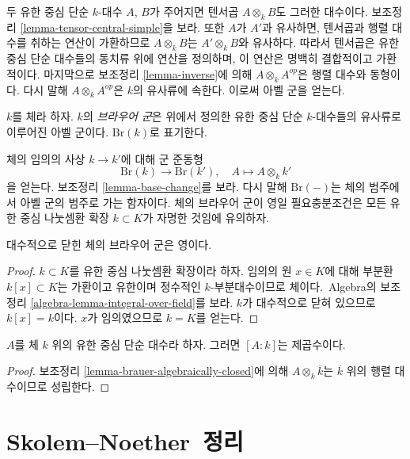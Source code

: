\noindent
두 유한 중심 단순 $k$-대수 $A$, $B$가 주어지면 텐서곱
$A \otimes_k B$도 그러한 대수이다. 보조정리
\ref{lemma-tensor-central-simple}을 보라.
또한 $A$가 $A'$과 유사하면, 텐서곱과 행렬 대수를 취하는 연산이 가환하므로
$A \otimes_k B$는 $A' \otimes_k B$와 유사하다. 따라서 텐서곱은 유한
중심 단순 대수들의 동치류 위에 연산을 정의하며, 이 연산은 명백히 결합적이고
가환적이다. 마지막으로 보조정리 \ref{lemma-inverse}에 의해
$A \otimes_k A^{op}$은 행렬 대수와 동형이다. 다시 말해
$A \otimes_k A^{op}$은 $k$의 유사류에 속한다. 이로써 아벨 군을 얻는다.

\begin{definition}
\label{definition-brauer-group}
$k$를 체라 하자. $k$의 {\it 브라우어 군}은 위에서 정의한 유한 중심 단순
$k$-대수들의 유사류로 이루어진 아벨 군이다. $\text{Br}(k)$로 표기한다.
\end{definition}

\noindent
체의 임의의 사상 $k \to k'$에 대해 군 준동형
$$
\text{Br}(k) \longrightarrow \text{Br}(k'),\quad
A \longmapsto A \otimes_k k'
$$
을 얻는다. 보조정리 \ref{lemma-base-change}를 보라. 다시 말해
$\text{Br}(-)$는 체의 범주에서 아벨 군의 범주로 가는 함자이다.
체의 브라우어 군이 영일 필요충분조건은 모든 유한 중심 나눗셈환 확장
$k \subset K$가 자명한 것임에 유의하자.

\begin{lemma}
\label{lemma-brauer-algebraically-closed}
대수적으로 닫힌 체의 브라우어 군은 영이다.
\end{lemma}

\begin{proof}
$k \subset K$를 유한 중심 나눗셈환 확장이라 하자. 임의의 원
$x \in K$에 대해 부분환 $k[x] \subset K$는 가환이고 유한이며 정수적인
$k$-부분대수이므로 체이다.~Algebra의 보조정리
\ref{algebra-lemma-integral-over-field}를 보라. $k$가 대수적으로 닫혀 있으므로
$k[x] = k$이다. $x$가 임의였으므로 $k = K$를 얻는다.
\end{proof}

\begin{lemma}
\label{lemma-dimension-square}
$A$를 체 $k$ 위의 유한 중심 단순 대수라 하자. 그러면 $[A : k]$는
제곱수이다.
\end{lemma}

\begin{proof}
보조정리 \ref{lemma-brauer-algebraically-closed}에 의해
$A \otimes_k \overline{k}$는 $\overline{k}$ 위의 행렬 대수이므로 성립한다.
\end{proof}

\section{Skolem--Noether~정리}
\label{section-skolem-noether}



